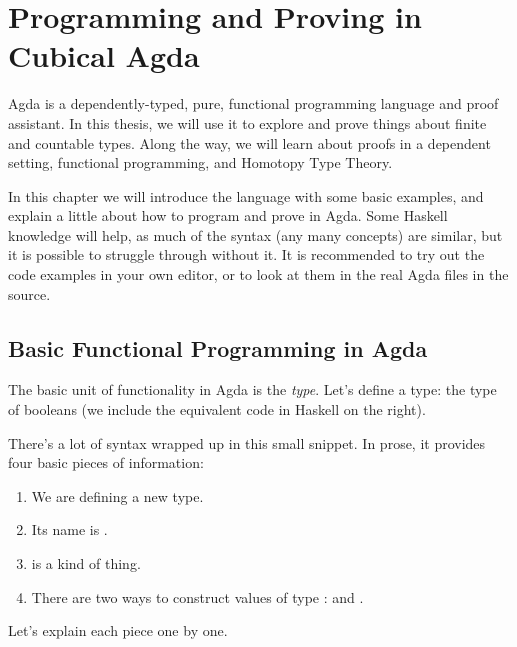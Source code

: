 \chapter{Programming and Proving in Cubical Agda}
Agda \cite{norellDependentlyTypedProgramming2008} is a dependently-typed, pure,
functional programming language and proof assistant.
In this thesis, we will use it to explore and prove things about finite and
countable types.
Along the way, we will learn about proofs in a dependent setting, functional
programming, and Homotopy Type Theory.

In this chapter we will introduce the language with some basic examples, and
explain a little about how to program and prove in Agda.
Some Haskell knowledge will help, as much of the syntax (any many concepts) are
similar, but it is possible to struggle through without it.
It is recommended to try out the code examples in your own editor, or to look at
them in the real Agda files in the source.

\section{Basic Functional Programming in Agda}
The basic unit of functionality in Agda is the \emph{type}.
Let's define a type: the type of booleans (we include the equivalent code in
Haskell on the right).
\begin{agdalisting} \label{bool-def}
  \begin{multicols}{2} \centering
     \columnbreak
  \end{multicols}\vspace{-2\baselineskip}
\end{agdalisting}
There's a lot of syntax wrapped up in this small snippet.
In prose, it provides four basic pieces of information:
\begin{enumerate}
  \item We are defining a new  type.
  \item Its name is .
  \item {} is a  kind of thing.
  \item There are two ways to construct values of type :
     and .
\end{enumerate}
Let's explain each piece one by one.

